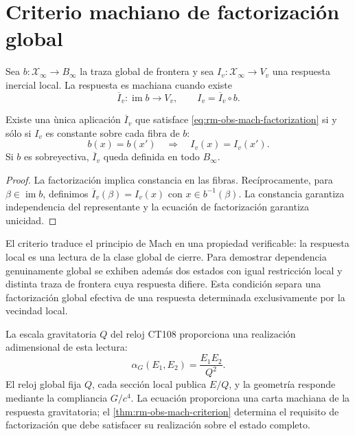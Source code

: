 \section{Criterio machiano de factorizaci\'on global}

Sea \(b:\mathcal X_\infty\to B_\infty\) la traza global de frontera y sea
\(I_v:\mathcal X_\infty\to V_v\) una respuesta inercial local. La
respuesta es machiana cuando existe
\begin{equation}
 \overline I_v:\operatorname{im}b\longrightarrow V_v,
 \qquad
 I_v=\overline I_v\circ b.
 \label{eq:rm-obs-mach-factorization}
\end{equation}

\begin{theorem}
\label{thm:rm-obs-mach-criterion}
Existe una \`unica aplicaci\'on \(\overline I_v\) que satisface
\cref{eq:rm-obs-mach-factorization} si y s\'olo si \(I_v\) es constante
sobre cada fibra de \(b\):
\begin{equation}
 b(x)=b(x')\quad\Longrightarrow\quad I_v(x)=I_v(x').
 \label{eq:rm-obs-mach-fiber-criterion}
\end{equation}
Si \(b\) es sobreyectiva, \(\overline I_v\) queda definida en todo
\(B_\infty\).
\end{theorem}

\begin{proof}
La factorizaci\'on implica constancia en las fibras. Rec\'iprocamente, para
\(\beta\in\operatorname{im}b\), definimos
\(\overline I_v(\beta)=I_v(x)\) con \(x\in b^{-1}(\beta)\). La constancia
garantiza independencia del representante y la ecuaci\'on de factorizaci\'on
garantiza unicidad.
\end{proof}

El criterio traduce el principio de Mach en una propiedad verificable: la
respuesta local es una lectura de la clase global de cierre. Para demostrar
dependencia genuinamente global se exhiben adem\'as dos estados con igual
restricci\'on local y distinta traza de frontera cuya respuesta difiere.
Esta condici\'on separa una factorizaci\'on global efectiva de una respuesta
determinada exclusivamente por la vecindad local.

La escala gravitatoria \(Q\) del reloj CT108 proporciona una realizaci\'on
adimensional de esta lectura:
\begin{equation}
 \alpha_G(E_1,E_2)=\frac{E_1E_2}{Q^2}.
 \label{eq:rm-obs-global-clock-coupling}
\end{equation}
El reloj global fija \(Q\), cada secci\'on local publica \(E/Q\), y la
geometr\'ia responde mediante la compliancia \(G/c^4\). La ecuaci\'on
proporciona una carta machiana de la respuesta gravitatoria; el
\cref{thm:rm-obs-mach-criterion} determina el requisito de factorizaci\'on
que debe satisfacer su realizaci\'on sobre el estado completo.

